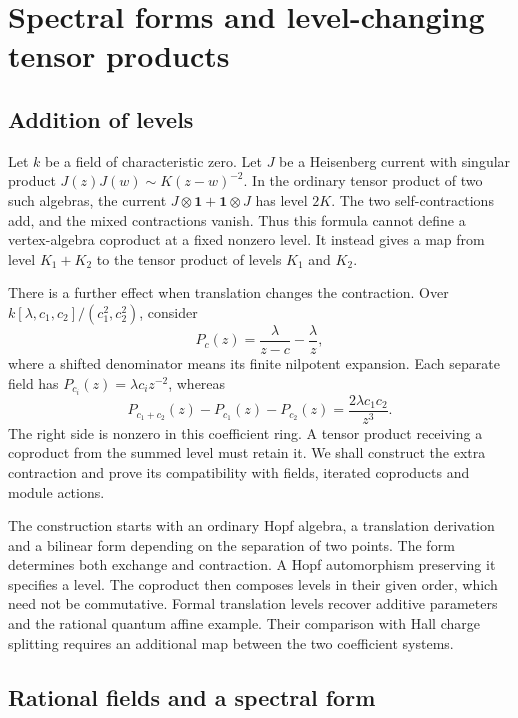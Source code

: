 \chapter{Spectral forms and level-changing tensor products}
\label{cylev:chapter}

\section{Addition of levels}

Let $k$ be a field of characteristic zero.
Let $J$ be a Heisenberg current with singular product
$J(z)J(w)\sim K(z-w)^{-2}$.
In the ordinary tensor product of two such algebras, the current
$J\otimes\mathbf1+\mathbf1\otimes J$ has level $2K$.
The two self-contractions add, and the mixed contractions vanish.
Thus this formula cannot define a vertex-algebra coproduct at a fixed
nonzero level. It instead gives a map from level $K_1+K_2$ to the
tensor product of levels $K_1$ and $K_2$.

There is a further effect when translation changes the contraction.
Over $k[\lambda,c_1,c_2]/(c_1^2,c_2^2)$, consider
\[
 P_c(z)=\frac{\lambda}{z-c}-\frac{\lambda}{z},
\]
where a shifted denominator means its finite nilpotent expansion.
Each separate field has $P_{c_i}(z)=\lambda c_i z^{-2}$, whereas
\begin{equation}\label{cylev:eq:opening-cross}
 P_{c_1+c_2}(z)-P_{c_1}(z)-P_{c_2}(z)
       =\frac{2\lambda c_1c_2}{z^3}.
\end{equation}
The right side is nonzero in this coefficient ring.
A tensor product receiving a coproduct from the summed level must
retain it. We shall construct the extra contraction and prove its
compatibility with fields, iterated coproducts and module actions.

The construction starts with an ordinary Hopf algebra, a translation
derivation and a bilinear form depending on the separation of two
points. The form determines both exchange and contraction. A Hopf
automorphism preserving it specifies a level. The coproduct then
composes levels in their given order, which need not be commutative.
Formal translation levels recover additive parameters and the rational
quantum affine example. Their comparison with Hall charge splitting
requires an additional map between the two coefficient systems.

\section{Rational fields and a spectral form}

